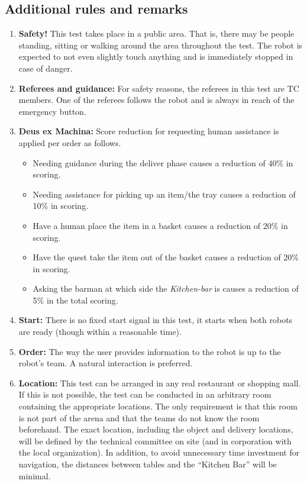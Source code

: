 \subsection{Additional rules and remarks}
\begin{enumerate}[nosep]
	\item \textbf{Safety!} This test takes place in a public area. That is, there may be people standing, sitting or walking around the area throughout the test. The robot is expected to not even slightly touch anything and is immediately stopped in case of danger.

	\item \textbf{Referees and guidance:} For safety reasons, the referees in this test are TC members. One of the referees follows the robot and is always in reach of the emergency button.

    \item \textbf{Deus ex Machina:} Score reduction for requesting human assistance is applied per order as follows.
        \begin{itemize}[nosep]
          \item Needing guidance during the deliver phase causes a reduction of 40\% in scoring.
          \item Needing assistance for picking up an item/the tray causes a reduction of 10\% in scoring.
          \item Have a human place the item in a basket causes a reduction of 20\% in scoring.
          \item Have the quest take the item out of the basket causes a reduction of 20\% in scoring.
          \item Asking the barman at which side the \textit{Kitchen-bar} is causes a reduction of 5\% in the total scoring.
        \end{itemize}

	\item \textbf{Start:} There is no fixed start signal in this test, it starts when both robots are ready (though within a reasonable time).

	\item \textbf{Order:} The way the user provides information to the robot is up to the robot's team. A natural interaction is preferred.

	\item \textbf{Location:} This test can be arranged in any real restaurant or shopping mall. If this is not possible, the test can be conducted in an arbitrary room containing the appropriate locations.
	  The only requirement is that this room is not part of the arena and that the teams do not know the room beforehand.
	  The exact location, including the object and delivery locations, will be defined by the technical committee on site (and in corporation with the local organization).
	  In addition, to avoid unnecessary time investment for navigation, the distances between tables and the \enquote{Kitchen Bar} will be minimal.


\end{enumerate}
